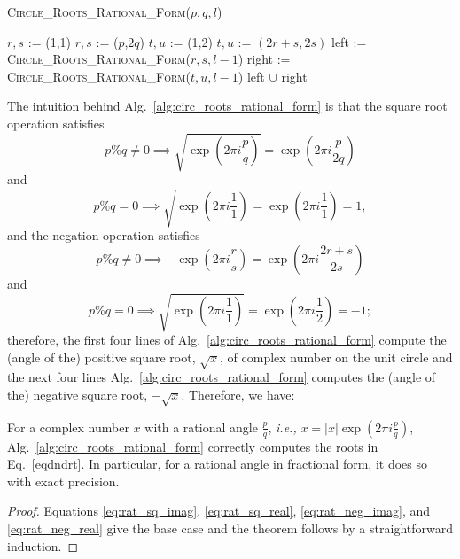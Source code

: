 \documentclass[runningheads]{llncs}
\begin{document}
\begin{algorithm}
   \caption{\textsc{Circle\_Roots\_Rational\_Form}($p,q,l$)}
   \label{alg:circ_roots_rational_form}
\begin{algorithmic}
  \STATE  $r, s$ := (1,1)
\ELSE
  \STATE  $r, s$ := ($p$,$2q$)
\ENDIF
    \STATE $t, u$ := (1,2)
  \ELSE
    \STATE $t, u$ := $(2r+s, 2s)$
  \ENDIF
		  \RETURN [($r,s$),($t,u$)]
		\STATE left  := \textsc{Circle\_Roots\_Rational\_Form}($r,s,l-1$)
		\STATE right := \textsc{Circle\_Roots\_Rational\_Form}($t,u,l-1$)
		\RETURN left $\cup$ right
	\ELSE
		\RETURN  [($p,q$)]
      \ENDIF
\end{algorithmic}
\end{algorithm}

The intuition behind Alg.~\ref{alg:circ_roots_rational_form} is that the square root operation satisfies
\begin{equation}\label{eq:rat_sq_imag}
p \% q \neq  0 \implies   \sqrt{\exp \left(2 \pi i \frac{p}{q}\right)}  = \exp \left(2 \pi i \frac{p}{2q}\right)
\end{equation}
and
\begin{equation}\label{eq:rat_sq_real}
p \% q = 0 \implies   \sqrt{\exp \left(2 \pi i \frac{1}{1}\right)}  = \exp \left(2 \pi i \frac{1}{1}\right) = 1,
\end{equation}
and the negation operation satisfies
\begin{equation}\label{eq:rat_neg_imag}
p \% q \neq  0 \implies   -\exp \left(2 \pi i \frac{r}{s}\right)  = \exp \left(2 \pi i \frac{2r+s} {2s}\right)
\end{equation}
and
\begin{equation}\label{eq:rat_neg_real}
p \% q = 0 \implies   \sqrt{\exp \left(2 \pi i \frac{1}{1}\right)}  = \exp \left(2 \pi i \frac{1}{2}\right) = -1;
\end{equation}
therefore, the first four lines of Alg.~\ref{alg:circ_roots_rational_form} compute the (angle of the) positive square root, $\sqrt{x}$, of complex number on the unit circle and the next four lines Alg.~\ref{alg:circ_roots_rational_form} computes the (angle of the) negative square root, $-\sqrt{x}$. Therefore, we have:
\begin{theorem}\label{thm:rat_root_correctness}
  For a complex number $x$ with a rational angle $\frac{p}{q}$, \emph{i.e.,} $x = |x|\exp \left(2 \pi i \frac{p}{q}\right)$, Alg.~\ref{alg:circ_roots_rational_form} correctly computes the roots in Eq.~\ref{eqdndrt}. In particular, for a rational angle in fractional form, it does so with exact precision.
\end{theorem}
\begin{proof}
Equations \ref{eq:rat_sq_imag}, \ref{eq:rat_sq_real}, \ref{eq:rat_neg_imag}, and \ref{eq:rat_neg_real} give the base case and the theorem follows by a straightforward induction.
\end{proof}
\end{document}
